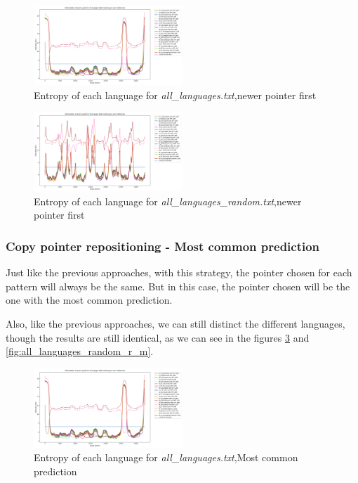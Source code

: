 \documentclass{article}
\begin{document}
\begin{figure}
    \centering
    \includegraphics[width=0.5\textwidth]{../results/all_languages/-r_n.png}
    \caption{Entropy of each language for \textit{all\_languages.txt},newer pointer first}
    \label{fig:all_languages_r_n}
\end{figure}

\begin{figure}
    \centering
    \includegraphics[width=0.5\textwidth]{../results/all_languages_random/-r_n.png}
    \caption{Entropy of each language for \textit{all\_languages\_random.txt},newer pointer first}
    \label{fig:all_languages_random_r_n}
\end{figure}

\subsubsection{Copy pointer repositioning - Most common prediction}
\label{subsubsec:results_locate_lang_most_common_prediction}

Just like the previous approaches, with this strategy, the pointer chosen for each pattern will always be the same.
But in this case, the pointer chosen will be the one with the most common prediction.

Also, like the previous approaches, we can still distinct the different languages, though the results are still identical, as we can see in the figures \ref{fig:all_languages_r_m} and \ref{fig:all_languages_random_r_m}.

\begin{figure}
    \centering
    \includegraphics[width=0.5\textwidth]{../results/all_languages/-r_m.png}
    \caption{Entropy of each language for \textit{all\_languages.txt},Most common prediction}
    \label{fig:all_languages_r_m}
\end{figure}
\end{document}
